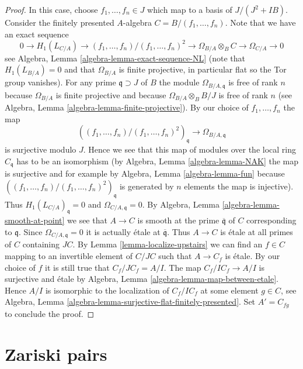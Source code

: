\begin{proof}
\medskip\noindent
In this case, choose $f_1, \ldots, f_n \in J$ which map to a
basis of $J/(J^2 + IB)$. Consider the finitely presented $A$-algebra
$C = B/(f_1, \ldots, f_n)$. Note that we have an exact sequence
$$
0 \to H_1(L_{C/A}) \to (f_1, \ldots, f_n)/(f_1, \ldots, f_n)^2
\to \Omega_{B/A} \otimes_B C \to \Omega_{C/A} \to 0
$$
see Algebra, Lemma \ref{algebra-lemma-exact-sequence-NL} (note that
$H_1(L_{B/A}) = 0$ and that $\Omega_{B/A}$ is finite projective,
in particular flat so the Tor group vanishes). For any prime
$\mathfrak q \supset J$ of $B$ the module $\Omega_{B/A, \mathfrak q}$
is free of rank $n$ because $\Omega_{B/A}$ is finite projective and
because $\Omega_{B/A} \otimes_B B/J$ is free of rank $n$
(see Algebra, Lemma \ref{algebra-lemma-finite-projective}). By our choice
of $f_1, \ldots, f_n$ the map
$$
\left((f_1, \ldots, f_n)/(f_1, \ldots, f_n)^2\right)_{\mathfrak q}
\to
\Omega_{B/A, \mathfrak q}
$$
is surjective modulo $J$. Hence we see that this map of modules over
the local ring $C_{\mathfrak q}$ has to be an isomorphism
(by Algebra, Lemma \ref{algebra-lemma-NAK} the map is surjective
and for example by Algebra, Lemma \ref{algebra-lemma-fun}
because $((f_1, \ldots, f_n)/(f_1, \ldots, f_n)^2)_{\mathfrak q}$
is generated by $n$ elements the map is injective). Thus
$H_1(L_{C/A})_{\mathfrak q} = 0$ and $\Omega_{C/A, \mathfrak q} = 0$. By
Algebra, Lemma \ref{algebra-lemma-smooth-at-point}
we see that $A \to C$ is smooth at the prime $\overline{\mathfrak q}$
of $C$ corresponding to $\mathfrak q$. Since
$\Omega_{C/A, \mathfrak q} = 0$ it is actually \'etale at
$\overline{\mathfrak q}$. Thus $A \to C$ is \'etale at all primes
of $C$ containing $JC$. By Lemma \ref{lemma-localize-upstairs}
we can find an $f \in C$ mapping to an invertible element of $C/JC$ such that
$A \to C_f$ is \'etale. By our choice of $f$ it is still true that
$C_f/JC_f = A/I$. The map $C_f/IC_f \to A/I$ is surjective and
\'etale by Algebra, Lemma \ref{algebra-lemma-map-between-etale}.
Hence $A/I$ is isomorphic to the localization of $C_f/IC_f$ at
some element $g \in C$, see
Algebra, Lemma \ref{algebra-lemma-surjective-flat-finitely-presented}.
Set $A' = C_{fg}$ to conclude the proof.
\end{proof}








\section{Zariski pairs}
\label{section-zariski-pairs}

